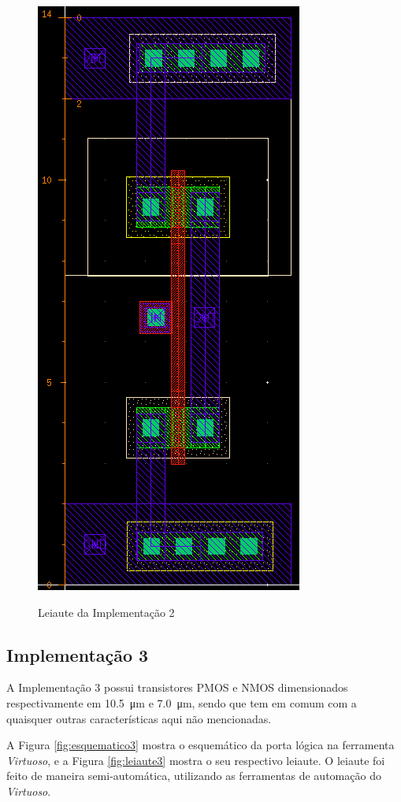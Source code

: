 \documentclass{iiufrgs}
\newcommand{\virtuoso}{\textit{Virtuoso}}
\begin{document}
\begin{figure}[htbp]
    \centering
    \caption{Leiaute da Implementação 2}
    \includegraphics[scale=0.8]{images/layout2.png}
    \label{fig:leiaute2}
\end{figure}

\FloatBarrier

\subsection{Implementação 3}\label{impl3}
A Implementação 3 possui transistores PMOS e NMOS dimensionados respectivamente em \SI{10.5}{\um} e \SI{7.0}{\um}, sendo que tem em comum com a  quaisquer outras características aqui não mencionadas.\

A Figura \ref{fig:esquematico3} mostra o esquemático da porta lógica na ferramenta \virtuoso, e a Figura \ref{fig:leiaute3} mostra o seu respectivo leiaute. O leiaute foi feito de maneira semi-automática, utilizando as ferramentas de automação do \virtuoso.
\end{document}
